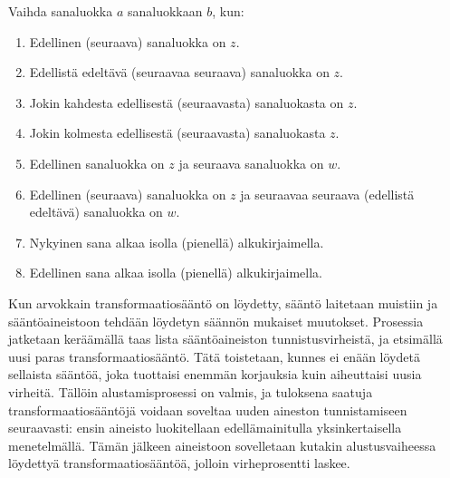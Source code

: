 \documentclass[utf8,bachelor,manualbib]{gradu3}
\begin{document}
Vaihda sanaluokka $a$ sanaluokkaan $b$, kun:

\begin{enumerate}
\item Edellinen (seuraava) sanaluokka on $z$.
\item Edellistä edeltävä (seuraavaa seuraava) sanaluokka on $z$. 
\item Jokin kahdesta edellisestä (seuraavasta) sanaluokasta on $z$.
\item Jokin kolmesta edellisestä (seuraavasta) sanaluokasta $z$.
\item Edellinen sanaluokka on $z$ ja seuraava sanaluokka on $w$.
\item Edellinen (seuraava) sanaluokka on $z$ ja seuraavaa seuraava (edellistä edeltävä) sanaluokka on $w$. 
\item Nykyinen sana alkaa isolla (pienellä) alkukirjaimella.
\item Edellinen sana alkaa isolla (pienellä) alkukirjaimella.
\end{enumerate}

Kun arvokkain transformaatiosääntö on löydetty, sääntö laitetaan muistiin ja sääntöaineistoon tehdään löydetyn säännön mukaiset muutokset. Prosessia jatketaan keräämällä taas lista sääntöaineiston tunnistusvirheistä, ja etsimällä uusi paras transformaatiosääntö. Tätä toistetaan, kunnes ei enään löydetä sellaista sääntöä, joka tuottaisi enemmän korjauksia kuin aiheuttaisi uusia virheitä. Tällöin alustamisprosessi on valmis, ja tuloksena saatuja transformaatiosääntöjä voidaan soveltaa uuden aineston tunnistamiseen seuraavasti: ensin aineisto luokitellaan edellämainitulla yksinkertaisella menetelmällä. Tämän jälkeen aineistoon sovelletaan kutakin alustusvaiheessa löydettyä transformaatiosääntöä, jolloin virheprosentti laskee. \citep{brill1992}
\end{document}
